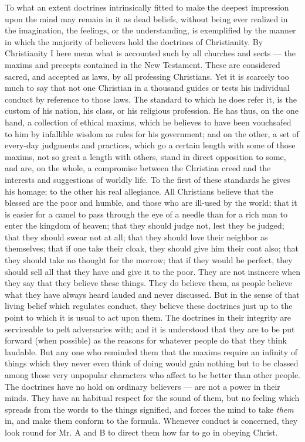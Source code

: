 \documentclass[12pt]{report}
\begin{document}
To what an extent doctrines intrinsically fitted to make the deepest impression upon the mind may remain in it as dead beliefs, without being ever realized in the imagination, the feelings, or the understanding, is exemplified by the manner in which the majority of believers hold the doctrines of Christianity. By Christianity I here mean what is accounted such by all churches and sects — the maxims and precepts contained in the New Testament. These are considered sacred, and accepted as laws, by all professing Christians. Yet it is scarcely too much to say that not one Christian in a thousand guides or tests his individual conduct by reference to those laws. The standard to which he does refer it, is the custom of his nation, his class, or his religious profession. He has thus, on the one hand, a collection of ethical maxims, which he believes to have been vouchsafed to him by infallible wisdom as rules for his government; and on the other, a set of every-day judgments and practices, which go a certain length with some of those maxims, not so great a length with others, stand in direct opposition to some, and are, on the whole, a compromise between the Christian creed and the interests and suggestions of worldly life. To the first of these standards he gives his homage; to the other his real allegiance. All Christians believe that the blessed are the poor and humble, and those who are ill-used by the world; that it is easier for a camel to pass through the eye of a needle than for a rich man to enter the kingdom of heaven; that they should judge not, lest they be judged; that they should swear not at all; that they should love their neighbor as themselves; that if one take their cloak, they should give him their coat also; that they should take no thought for the morrow; that if they would be perfect, they should sell all that they have and give it to the poor. They are not insincere when they say that they believe these things. They do believe them, as people believe what they have always heard lauded and never discussed. But in the sense of that living belief which regulates conduct, they believe these doctrines just up to the point to which it is usual to act upon them. The doctrines in their integrity are serviceable to pelt adversaries with; and it is understood that they are to be put forward (when possible) as the reasons for whatever people do that they think laudable. But any one who reminded them that the maxims require an infinity of things which they never even think of doing would gain nothing but to be classed among those very unpopular characters who affect to be better than other people. The doctrines have no hold on ordinary believers — are not a power in their minds. They have an habitual respect for the sound of them, but no feeling which spreads from the words to the things signified, and forces the mind to take \emph{them} in, and make them conform to the formula. Whenever conduct is concerned, they look round for Mr. A and B to direct them how far to go in obeying Christ.
\end{document}
